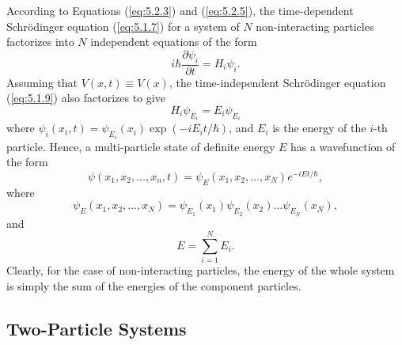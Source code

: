 According to Equations (\ref{eq:5.2.3}) and (\ref{eq:5.2.5}), the time-dependent Schrödinger equation (\ref{eq:5.1.7}) for a system of $N$ non-interacting particles factorizes into $N$ independent equations of the form
\begin{equation}
	i\hbar\frac{\partial\psi_{i}}{\partial t} = H_{i}\psi_{i}.
	\label{eq:5.2.7}
\end{equation}
Assuming that $V(x, t) \equiv V(x)$, the time-independent Schrödinger equation (\ref{eq:5.1.9}) also factorizes to give
\begin{equation}
	H_{i}\psi_{E_{i}} = E_{i}\psi_{E_{i}}
	\label{eq:5.2.8}
\end{equation}
where $\psi_{i}(x_{i}, t) = \psi_{E_{i}}(x_{i})\exp(-i E_{i} t/\hbar)$, and $E_{i}$ is the energy of the $i$-th particle. Hence, a multi-particle state of definite energy $E$ has a wavefunction of the form
\begin{equation}
	\psi(x_{1}, x_{2},\ldots, x_{n}, t) = \psi_{E}(x_{1}, x_{2},\ldots, x_{N}) e^{-i E t/\hbar},
	\label{eq:5.2.9}
\end{equation}
where
\begin{equation}
	\psi_{E}(x_{1},x_{2},...,x_{N}) = \psi_{E_{1}}(x_{1})\psi_{E_{2}}(x_{2})\ldots\psi_{E_{N}}(x_{N}),
	\label{eq:5.2.10}
\end{equation}
and
\begin{equation}
	E = \sum_{i=1}^{N} E_{i}.
	\label{eq:5.2.11}
\end{equation}
Clearly, for the case of non-interacting particles, the energy of the whole system is simply the sum of the energies of the component particles.


\subsection{Two-Particle Systems}
\label{sec:5.3}

